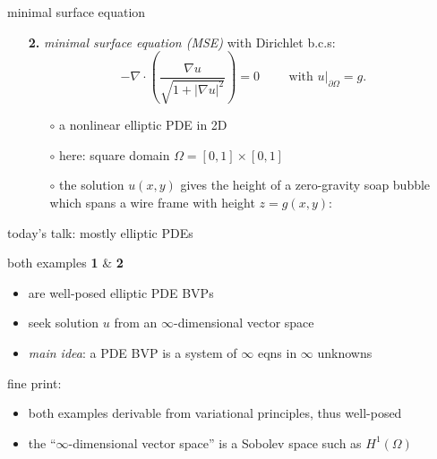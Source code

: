 \documentclass[hide notes,intlimits,usenames,dvipsnames]{beamer}
\newcommand{\grad}{\nabla}
\begin{document}
\begin{frame}{minimal surface equation}

\begin{itemize}
\item[\textbf{2.}] \emph{minimal surface equation (MSE)} with Dirichlet b.c.s:
	    $$- \grad\cdot \left(\frac{\grad u}{\sqrt{1 + |\grad u|^2}}\right) = 0  \qquad \text{ with } u\big|_{\partial \Omega} = g.$$
    \vspace{-2mm}
	\begin{itemize}
	\item[$\circ$] a nonlinear elliptic PDE in 2D
	\item[$\circ$] here: square domain $\Omega = [0,1] \times [0,1]$
	\item[$\circ$] the solution $u(x,y)$ gives the height of a zero-gravity soap bubble which spans a wire frame with height $z=g(x,y)$:
	\end{itemize}

\begin{center}
\end{center}
\end{itemize}
\end{frame}


\begin{frame}{today's talk: mostly elliptic PDEs}

both examples {\color{Blue} \textbf{1}} \& {\color{Blue} \textbf{2}}
\begin{itemize}
\item are well-posed elliptic PDE BVPs
\item seek solution $u$ from an \alert{$\infty$-dimensional vector space}
\item \emph{main idea}: a PDE BVP is a system of $\infty$ eqns in $\infty$ unknowns
\end{itemize}

\bigskip\bigskip\bigskip

\scriptsize
fine print:
\begin{itemize}
\item both examples derivable from variational principles, thus well-posed
\item the ``$\infty$-dimensional vector space'' is a Sobolev space such as $H^1(\Omega)$
\end{itemize}
\end{frame}
\end{document}
